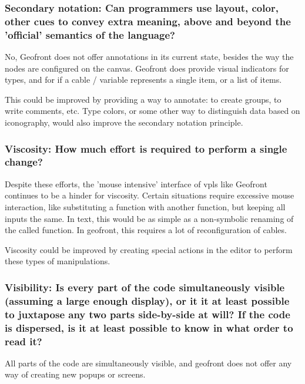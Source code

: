 \subsubsection*{Secondary notation: Can programmers use layout, color, other cues to convey extra meaning, above and beyond the 'official' semantics of the language?}

No, Geofront does not offer annotations in its current state, besides the way the nodes are configured on the canvas.  
Geofront does provide visual indicators for types, and for if a cable / variable represents a single item, or a list of items.

This could be improved by providing a way to annotate: to create groups, to write comments, etc. 
Type colors, or some other way to distinguish data based on iconography, would also improve the secondary notation principle.

\subsubsection*{Viscosity: How much effort is required to perform a single change?}

Despite these efforts, the 'mouse intensive' interface of vpls like Geofront continues to be a hinder for viscosity.
Certain situations require excessive mouse interaction, like substituting a function with another function, but keeping all inputs the same.
In text, this would be as simple as a non-symbolic renaming of the called function.
In geofront, this requires a lot of reconfiguration of cables. 

Viscosity could be improved by creating special actions in the editor to perform these types of manipulations.  

\subsubsection*{Visibility: Is every part of the code simultaneously visible (assuming a large enough display), or it it at least possible to juxtapose any two parts side-by-side at will? If the code is dispersed, is it at least possible to know in what order to read it?}

All parts of the code are simultaneously visible, and geofront does not offer any way of creating new popups or screens.

